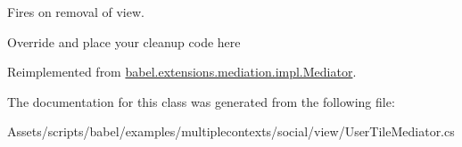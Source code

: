 Fires on removal of view. 

Override and place your cleanup code here 

Reimplemented from \hyperlink{classbabel_1_1extensions_1_1mediation_1_1impl_1_1_mediator_a8b818665eda883eac66c83b8468007e9}{babel.\-extensions.\-mediation.\-impl.\-Mediator}.



The documentation for this class was generated from the following file\-:\begin{DoxyCompactItemize}
\item 
Assets/scripts/babel/examples/multiplecontexts/social/view/User\-Tile\-Mediator.\-cs\end{DoxyCompactItemize}
